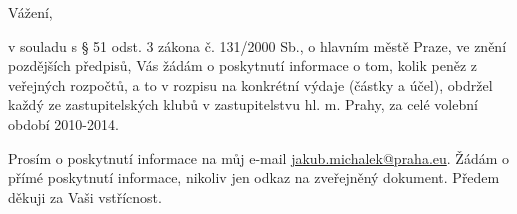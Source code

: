\documentclass[11pt,a4paper,czech]{article}
\begin{document}

\def \yoursign { }
\def \yourdate { }
\def \oursign {ZK Pha 5/2014}
\def \place {Praha}

\printheader

\subject{Žádost zastupitele hl. m. Prahy o informace}

Vážení,

v souladu s § 51 odst. 3 zákona č. 131/2000 Sb., o hlavním městě Praze, ve znění pozdějších předpisů, Vás žádám o poskytnutí informace o tom, kolik peněz z veřejných rozpočtů, a to v rozpisu na konkrétní výdaje (částky a účel), obdržel každý ze zastupitelských klubů v zastupitelstvu hl. m. Prahy, za celé volební období 2010-2014.

Prosím o poskytnutí informace na můj e-mail \url{jakub.michalek@praha.eu}. Žádám o přímé poskytnutí informace, nikoliv jen odkaz na zveřejněný dokument. Předem děkuji za Vaši vstřícnost.

\signature{Mgr. Bc. Jakub Michálek \\ předseda klubu Pirátů \\ zastupitelstvo hl. m. Prahy}

\end{document}
